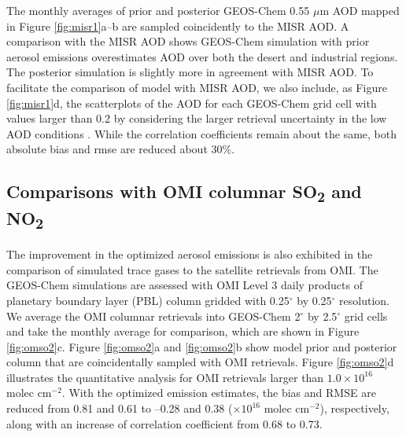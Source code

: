  The monthly averages of prior and posterior GEOS-Chem 0.55 $\mu$m AOD
 mapped in Figure \ref{fig:misr1}a--b are sampled coincidently to the MISR AOD.
 A comparison with the MISR AOD shows GEOS-Chem simulation with prior aerosol emissions
 overestimates AOD over both the desert and industrial regions.
 The posterior simulation is slightly more in agreement with MISR AOD.
 To facilitate the comparison of model with MISR AOD, we also include, as Figure \ref{fig:misr1}d,
 the scatterplots of the AOD for each GEOS-Chem grid cell with values larger than 0.2
 by considering the larger retrieval uncertainty in the low AOD conditions \citep{Kahn05,Kahn10}.
 While the correlation coefficients remain about the same,
 both absolute bias and rmse are reduced about 30\%.

 \subsection{Comparisons with OMI columnar SO\textsubscript{2} and NO\textsubscript{2}}

 The improvement in the optimized aerosol emissions is also exhibited
 in the comparison of simulated trace gases to the satellite retrievals from OMI.
 The GEOS-Chem  simulations are assessed with OMI Level 3 daily products
 of planetary boundary layer (PBL)  column gridded
 with 0.25$^{\circ}$ by 0.25$^{\circ}$ resolution.
 We average the OMI  columnar retrievals into GEOS-Chem 2$^{\circ}$ by 2.5$^{\circ}$ grid cells
 and take the monthly average for comparison, which are shown in Figure \ref{fig:omso2}c.
 Figure \ref{fig:omso2}a and \ref{fig:omso2}b show model prior and posterior  column
 that are coincidentally sampled with OMI retrievals.
 Figure \ref{fig:omso2}d illustrates the quantitative analysis for OMI  retrievals
 larger than $1.0 \times 10^{16}$ molec cm$^{-2}$.
 With the optimized emission estimates, the bias and RMSE are reduced
 from 0.81 and 0.61 to --0.28 and 0.38 ($\times 10^{16}$ molec cm$^{-2}$), respectively,
 along with an increase of correlation coefficient from 0.68 to 0.73. 

